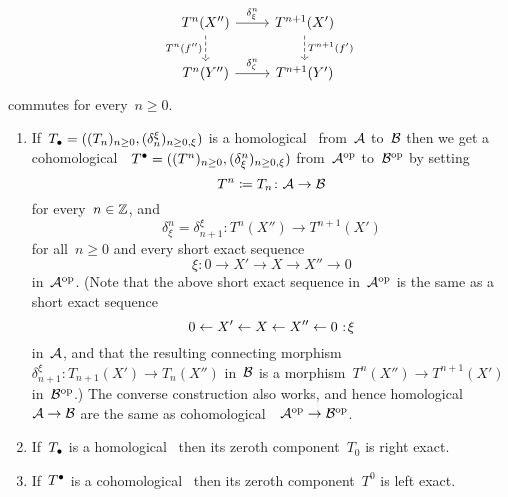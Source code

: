\begin{definition}
\begin{enumerate}
\begin{enumerate}[label=(C$\delta$\arabic*)]
          \[
            \begin{tikzcd}
                T^n(X'')
                \arrow{r}[above]{\delta_\xi^n}
                \arrow[dashed]{d}[left]{T^n(f'')}
              & T^{n+1}(X')
                \arrow[dashed]{d}[right]{T^{n+1}(f')}
              \\
                T^n(Y'')
                \arrow{r}[above]{\delta_\zeta^n}
              & T^{n+1}(Y')
            \end{tikzcd}
          \]
          commutes for every~$n \geq 0$.
      \end{enumerate}
  \end{enumerate}
\end{definition}


\begin{remark}
  \leavevmode
  \begin{enumerate}
    \item
      If~$T_\bullet = ((T_n)_{n \geq 0}, (\delta_n^\xi)_{n \geq 0, \xi})$ is a homological~{\deltafun} from~$\mathcal{A}$ to~$\mathcal{B}$ then we get a cohomological~{\deltafun}~$T^\bullet = ((T^n)_{n \geq 0}, (\delta_\xi^n)_{n \geq 0, \xi})$ from~$\mathcal{A}^{\mathrm{op}}$ to~$\mathcal{B}^{\mathrm{op}}$ by setting
      \[
                  T^n
        \coloneqq  T_n
        \colon    \mathcal{A}
        \to       \mathcal{B}
      \]
      for every~$n \in \mathbb{Z}$, and
      \[
                \delta_\xi^n
        =       \delta^\xi_{n+1}
        \colon  T^n(X'')
        \to     T^{n+1}(X')
      \]
      for all~$n \geq 0$ and every short exact sequence
      \[
        \xi
        \colon
        0
        \to
        X'
        \to
        X
        \to
        X''
        \to
        0
      \]
      in~$\mathcal{A}^{\mathrm{op}}$.
      (Note that the above short exact sequence in~$\mathcal{A}^{\mathrm{op}}$ is the same as a short exact sequence
      \[
        0
        \from
        X'
        \from
        X
        \from
        X''
        \from
        0
        \cocolon
        \xi
      \]
      in~$\mathcal{A}$, and that the resulting connecting morphism~$\delta^\xi_{n+1} \colon T_{n+1}(X') \to T_n(X'')$ in~$\mathcal{B}$ is a morphism~$T^n(X'') \to T^{n+1}(X')$ in~$\mathcal{B}^{\mathrm{op}}$.)
      The converse construction also works, and hence homological~{\deltafuns}~$\mathcal{A} \to \mathcal{B}$ are the same as cohomological~{\deltafuns}~$\mathcal{A}^{\mathrm{op}} \to \mathcal{B}^{\mathrm{op}}$.
    \item
      If~$T_\bullet$ is a homological~{\deltafun} then its zeroth component~$T_0$ is right exact.
    \item
      If~$T^\bullet$ is a cohomological~{\deltafun} then its zeroth component~$T^0$ is left exact.
  \end{enumerate}
\end{remark}


